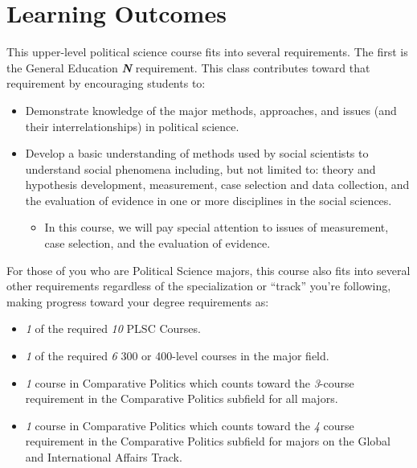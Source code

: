 \documentclass[12pt]{article}
\begin{document}
\section*{Learning Outcomes}
This upper-level political science course fits into several requirements. The first is the General Education \textit{\textbf{N}} requirement. This class contributes toward that requirement by encouraging students to:
\begin{itemize}
    \item Demonstrate knowledge of the major methods, approaches, and issues (and their interrelationships) in political science.
    \item Develop a basic understanding of methods used by social scientists to understand social phenomena including, but not limited to: theory and hypothesis development, measurement, case selection and data collection, and the evaluation of evidence in one or more disciplines in the social sciences.
    \begin{itemize}
        \item In this course, we will pay special attention to issues of measurement, case selection, and the evaluation of evidence.
    \end{itemize}
\end{itemize}

For those of you who are Political Science majors, this course also fits into several other requirements regardless of the specialization or ``track'' you're following, making progress toward your degree requirements as:
\begin{itemize}
    \item \textit{1} of the required \textit{10} PLSC Courses.
    \item \textit{1} of the required \textit{6} 300 or 400-level courses in the major field.
    \item \textit{1} course in Comparative Politics which counts toward the \textit{3}-course requirement in the Comparative Politics subfield for all majors.
    \item \textit{1} course in Comparative Politics which counts toward the \textit{4} course requirement in the Comparative Politics subfield for majors on the Global and International Affairs Track.
\end{itemize}
\end{document}
